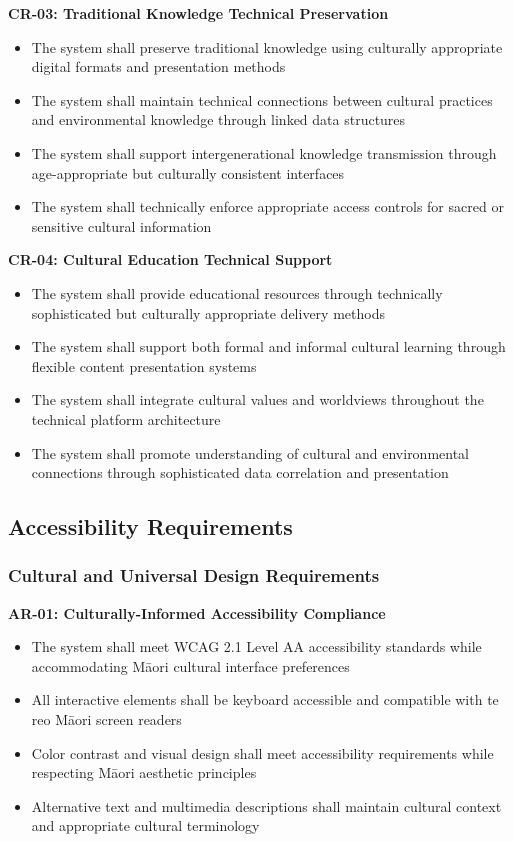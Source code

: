 \textbf{CR-03: Traditional Knowledge Technical Preservation}
\begin{itemize}
    \item The system shall preserve traditional knowledge using culturally appropriate digital formats and presentation methods
    \item The system shall maintain technical connections between cultural practices and environmental knowledge through linked data structures
    \item The system shall support intergenerational knowledge transmission through age-appropriate but culturally consistent interfaces
    \item The system shall technically enforce appropriate access controls for sacred or sensitive cultural information
\end{itemize}

\textbf{CR-04: Cultural Education Technical Support}
\begin{itemize}
    \item The system shall provide educational resources through technically sophisticated but culturally appropriate delivery methods
    \item The system shall support both formal and informal cultural learning through flexible content presentation systems
    \item The system shall integrate cultural values and worldviews throughout the technical platform architecture
    \item The system shall promote understanding of cultural and environmental connections through sophisticated data correlation and presentation
\end{itemize}

\subsection{Accessibility Requirements}
\label{subsec:accessibility_requirements}

\subsubsection{Cultural and Universal Design Requirements}
\label{subsubsec:cultural_universal_design}

\textbf{AR-01: Culturally-Informed Accessibility Compliance}
\begin{itemize}
    \item The system shall meet WCAG 2.1 Level AA accessibility standards while accommodating M\=aori cultural interface preferences
    \item All interactive elements shall be keyboard accessible and compatible with te reo M\=aori screen readers
    \item Color contrast and visual design shall meet accessibility requirements while respecting M\=aori aesthetic principles
    \item Alternative text and multimedia descriptions shall maintain cultural context and appropriate cultural terminology
\end{itemize}

